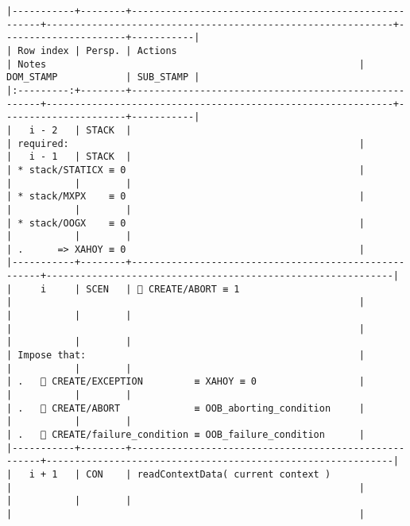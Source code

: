 \documentclass[varwidth=\maxdimen,margin=0.5cm,multi={verbatim}]{standalone}
\begin{document}
\begin{verbatim}
|-----------+--------+------------------------------------------------------+-------------------------------------------------------------+----------------------+-----------|
| Row index | Persp. | Actions                                              | Notes                                                       | DOM_STAMP            | SUB_STAMP |
|:---------:+--------+------------------------------------------------------+-------------------------------------------------------------+----------------------+-----------|
|   i - 2   | STACK  |                                                      | required:                                                   |
|   i - 1   | STACK  |                                                      | * stack/STATICX ≡ 0                                         |
|           |        |                                                      | * stack/MXPX    ≡ 0                                         |
|           |        |                                                      | * stack/OOGX    ≡ 0                                         |
|           |        |                                                      | .      => XAHOY ≡ 0                                         |
|-----------+--------+------------------------------------------------------+-------------------------------------------------------------|
|     i     | SCEN   |  CREATE/ABORT ≡ 1                                   |                                                             |
|           |        |                                                      |                                                             |
|           |        |                                                      | Impose that:                                                |
|           |        |                                                      | .    CREATE/EXCEPTION         ≡ XAHOY ≡ 0                  |
|           |        |                                                      | .    CREATE/ABORT             ≡ OOB_aborting_condition     |
|           |        |                                                      | .    CREATE/failure_condition ≡ OOB_failure_condition      |
|-----------+--------+------------------------------------------------------+-------------------------------------------------------------|
|   i + 1   | CON    | readContextData( current context )                   |                                                             |
|           |        |                                                      |                                                             |

\end{verbatim}
\end{document}
